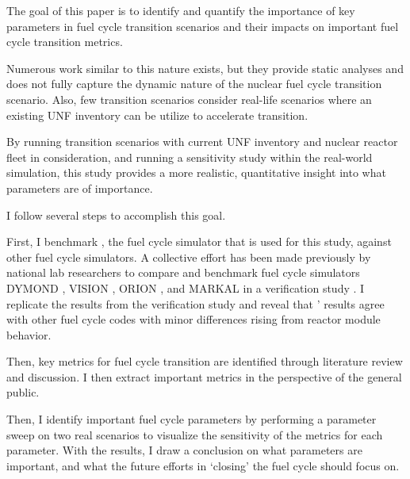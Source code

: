 The goal of this paper is to identify and quantify the
importance of key parameters in fuel cycle transition scenarios
and their impacts on important fuel cycle transition metrics.

Numerous work similar to this nature exists, but they provide
static analyses and does not fully capture the dynamic nature
of the nuclear fuel cycle transition scenario. Also, few
transition scenarios consider real-life scenarios
where an existing \gls{UNF} inventory can be utilize to
accelerate transition.

By running transition scenarios with current \gls{UNF}
inventory and nuclear reactor fleet in consideration,
and running a sensitivity study within the real-world simulation,
this study provides a more realistic, quantitative insight
into what parameters are of importance.

I follow several steps to accomplish this goal.

First, I benchmark \Cyclus, the fuel cycle simulator that is used for this study,
against other fuel cycle simulators. A collective effort has been made previously
by national lab researchers to compare
and benchmark fuel cycle simulators
DYMOND \cite{yacout_modeling_2005},
VISION \cite{jacobson_verifiable_2010},
ORION \cite{gregg_analysis_2012}, and
MARKAL \cite{shay_epa_2006} in a verification study \cite{feng_standardized_2016}.
I replicate the results from the verification study and reveal that \Cyclus'
results agree with other fuel cycle codes with minor differences rising from
reactor module behavior.

Then, key metrics for fuel cycle transition
are identified through literature review and discussion. I then
extract important metrics in the perspective of the general public.

Then, I identify important fuel cycle parameters by performing a parameter
sweep on two real scenarios to visualize the sensitivity of the metrics
for each parameter. With the results, I draw a conclusion on what parameters
are important, and what the future efforts in `closing' the fuel cycle
should focus on.
